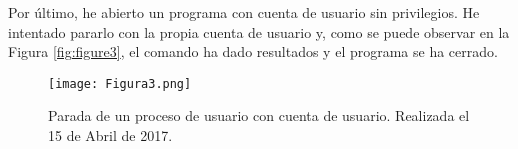 Por último, he abierto un programa con cuenta de usuario sin privilegios. He intentado pararlo con la propia cuenta de usuario y, como se puede observar en la Figura
\ref{fig:figure3}, el comando ha dado resultados y el programa se ha cerrado.

\begin{figure}[H] 
\centering
\texttt{[image: Figura3.png]}  
\caption{Parada de un proceso de usuario con cuenta de usuario. Realizada el 15 de Abril de 2017.} \label{fig:figura3}
\end{figure}

\newpage



